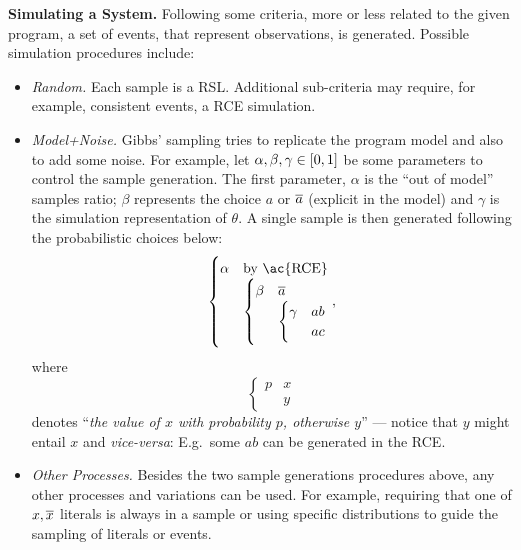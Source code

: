 \documentclass{article}
\renewcommand{\cite}{\citep}
\begin{document}
\bigskip\noindent\textbf{Simulating a System.} Following some
criteria, more or less related to the given program, a set of events,
that represent observations, is generated.  Possible simulation
procedures include:
\begin{itemize}

	\item \emph{Random.} Each sample is a \ac{RSL}.  Additional
	      sub-criteria may require, for example, consistent events, a \ac{RCE}
	      simulation.

	\item \emph{Model+Noise.} Gibbs' sampling \cite{geman84} tries to
	      replicate the program model and also to add some noise.  For
	      example, let \(\alpha, \beta, \gamma \in \intcc{0,1}\) be some
	      parameters to control the sample generation.  The first parameter,
	      \(\alpha\) is the ``out of model'' samples ratio; \(\beta\)
	      represents the choice \(a\) or \(\overline{a}\) (explicit in the model)
	      and \(\gamma\) is the simulation representation of \(\theta\).  A
	      single sample is then generated following the probabilistic choices
	      below:
	      \[
		      \begin{cases}
			      \alpha & \text{by \ac{RCE}} \\[0pt]
			             &
			      \begin{cases}
				      \beta & \co{a} \\[0pt]
				            &
				      \begin{cases}
					      \gamma & ab \\[0pt]
					             & ac
				      \end{cases}
			      \end{cases}
		      \end{cases},
	      \]
	      where \[
		      \begin{cases}
			      p & x \\[-4pt]
			        & y\end{cases}
	      \]
	      denotes ``\emph{the value of \(x\) with probability \(p\),
		      otherwise \(y\)}'' --- notice that \(y\) might entail
	      \(x\) and \emph{vice-versa}: E.g.\ some \(ab\) can be
	      generated in the \ac{RCE}.

	\item \emph{Other Processes.} Besides the two sample generations
	      procedures above, any other processes and variations can be used.
	      For example, requiring that one of \(x, \overline{x}\) literals is always
	      in a sample or using specific distributions to guide the sampling of
	      literals or events.

\end{itemize}
\end{document}
